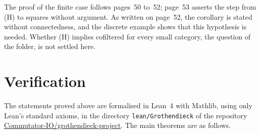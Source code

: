 \documentclass[11pt,a4paper]{amsart}
\theoremstyle{definition}
\theoremstyle{remark}
\begin{document}
The proof of the finite case follows pages~50 to~52; page~53 asserts the step from (H) to squares without argument. As written on page~52, the corollary is stated without connectedness, and the discrete example shows that this hypothesis is needed. Whether (H) implies cofiltered for every small category, the question of the folder, is not settled here.

\section{Verification}\label{sec:lean}
\begingroup\raggedright
The statements proved above are formalised in Lean~4 with Mathlib, using only Lean's standard axioms, in the directory \nolinkurl{lean/Grothendieck} of the repository \href{https://github.com/Commutator-IO/grothendieck-project}{Commutator-IO/grothendieck-project}. The main theorems are as follows.
\end{document}
